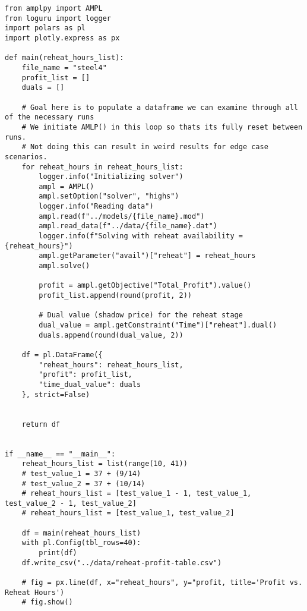 \begin{verbatim}
from amplpy import AMPL
from loguru import logger
import polars as pl
import plotly.express as px

def main(reheat_hours_list):
    file_name = "steel4"
    profit_list = []
    duals = []

    # Goal here is to populate a dataframe we can examine through all of the necessary runs
    # We initiate AMLP() in this loop so thats its fully reset between runs.
    # Not doing this can result in weird results for edge case scenarios.
    for reheat_hours in reheat_hours_list:
        logger.info("Initializing solver")
        ampl = AMPL()
        ampl.setOption("solver", "highs")
        logger.info("Reading data")
        ampl.read(f"../models/{file_name}.mod")
        ampl.read_data(f"../data/{file_name}.dat")
        logger.info(f"Solving with reheat availability = {reheat_hours}")
        ampl.getParameter("avail")["reheat"] = reheat_hours
        ampl.solve()

        profit = ampl.getObjective("Total_Profit").value()
        profit_list.append(round(profit, 2))

        # Dual value (shadow price) for the reheat stage
        dual_value = ampl.getConstraint("Time")["reheat"].dual()
        duals.append(round(dual_value, 2))

    df = pl.DataFrame({
        "reheat_hours": reheat_hours_list,
        "profit": profit_list,
        "time_dual_value": duals
    }, strict=False)


    return df


if __name__ == "__main__":
    reheat_hours_list = list(range(10, 41))
    # test_value_1 = 37 + (9/14)
    # test_value_2 = 37 + (10/14)
    # reheat_hours_list = [test_value_1 - 1, test_value_1, test_value_2 - 1, test_value_2]
    # reheat_hours_list = [test_value_1, test_value_2]

    df = main(reheat_hours_list)
    with pl.Config(tbl_rows=40):
        print(df)
    df.write_csv("../data/reheat-profit-table.csv")

    # fig = px.line(df, x="reheat_hours", y="profit, title='Profit vs. Reheat Hours')
    # fig.show()
\end{verbatim}
